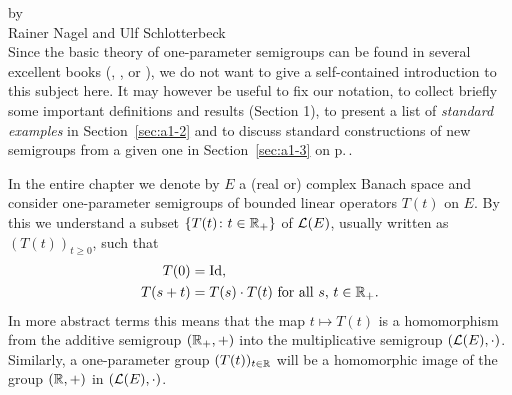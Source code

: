 \label{chap:a1}%
{\Large
\vspace*{-.75cm}
by \\[.25em]
Rainer Nagel and Ulf Schlotterbeck 
\vspace{.75cm}
\\
}
Since the basic theory of one-parameter semigroups can be found in several excellent books (\eg \citet{davies:1980}, \citet{goldstein:1985a}, \citet{pazy:1983} or \citet{hillephillips:1957}), we do not want to give a self-contained introduction to this subject here.
It may however be useful to fix our notation, to collect briefly some important definitions and results (Section 1), to present a list of \emph{standard examples} in Section~\ref{sec:a1-2} %
and to discuss standard constructions of new semigroups from a given one in Section~\ref{sec:a1-3} on p.\,\pageref{sec:a1-3}. %

In the entire chapter we denote by $E$ a (real or) complex Banach space and consider one-parameter semigroups of bounded linear operators $T(t)$ on $E$.
By this we understand a subset $\{T(t) \colon  t \in \mathbb{R}_{+}\}$ of $\mathcal{L}(E)$, usually written as $(T(t))_{t\geq0}$, such that
\begin{align*}
	T(0) &= \operatorname{Id}, \\
	T(s+t) &= T(s) \cdot T(t) \text{ for all $s$, $t \in \mathbb{R}_{+}$.}
\end{align*}
In more abstract terms this means that the map $t \mapsto T(t)$ is a homomorphism from the additive semigroup $(\mathbb{R}_{+},+)$ into the multiplicative semigroup $(\mathcal{L}(E),\cdot)$.
Similarly, a one-parameter group $(T(t))_{t\in\mathbb{R}}$ will be a homomorphic image of the group $(\mathbb{R},+)$ in $(\mathcal{L}(E),\cdot)$.
